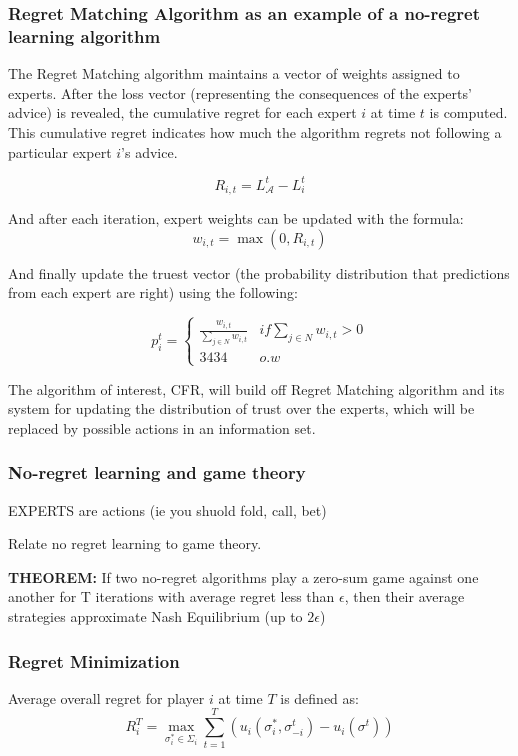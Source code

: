 \documentclass{article}
\begin{document}
\subsubsection{Regret Matching Algorithm as an example of  a no-regret learning algorithm}

The Regret Matching algorithm maintains a vector of weights assigned to experts. After the loss vector (representing the consequences of the experts' advice) is revealed, the cumulative regret for each expert \( i \) at time \( t \) is computed. This cumulative regret indicates how much the algorithm regrets not following a particular expert \( i \)'s advice.

\[ R_{i,t} = L^t_{\mathcal{A}} - L^t_i \]

And after each iteration, expert weights can be updated with the formula: 
\[ w_{i,t} = \max(0, R_{i,t}) \]

And finally update the truest vector (the probability distribution that predictions from each expert are right) using the following: 

\[
p_i^t = 
\begin{cases}
	\frac{w_{i,t}}{\sum_{j \in N} w_{i,t}} & if \sum_{j\in N}w_{i,t} > 0 \\
	3434 & o.w
\end{cases}
\]

The algorithm of interest, CFR, will build off Regret Matching algorithm and its system for updating the distribution of trust over the experts, which will be replaced by possible actions in an information set.


\subsubsection{No-regret learning and game theory}
EXPERTS are actions (ie you shuold fold, call, bet)

Relate no regret learning to game theory. 
 



\textbf{THEOREM:}
If two no-regret algorithms play a zero-sum game against one another for T iterations with average regret less than $\epsilon$, then their average strategies approximate Nash Equilibrium (up to $2 \epsilon$) 

\subsubsection{Regret Minimization}
Average overall regret for player $i$ at time $T$ is defined as:
\[ R^T_i = \max_{\sigma^*_i \in \Sigma_i} \sum_{t=1}^T (u_i(\sigma^*_i, \sigma_{-i}^t) - u_i(\sigma^t)) \]
\end{document}

